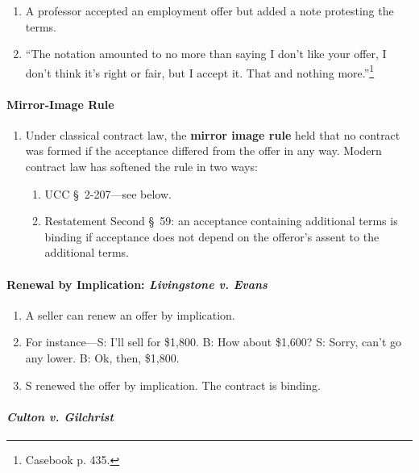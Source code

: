\begin{enumerate}
    \item A professor accepted an employment offer but added a note protesting 
    the terms.
    \item ``The notation amounted to no more than saying I don't like your 
    offer, I don't think it's right or fair, but I accept it. That and nothing 
    more.''\footnote{Casebook p. 435.}
\end{enumerate}

\paragraph{Mirror-Image Rule}

\begin{enumerate}
    \item Under classical contract law, the \textbf{mirror image rule} held 
    that no contract was formed if the acceptance differed from the offer in 
    any way. Modern contract law has softened the rule in two ways:
    \begin{enumerate}
        \item UCC \S\ 2-207---see below.
        \item Restatement Second \S\ 59: an acceptance containing additional 
        terms is binding if acceptance does not depend on the offeror's assent 
        to the additional terms.
    \end{enumerate}
\end{enumerate}

\paragraph{Renewal by Implication: \emph{Livingstone v. Evans}}

\begin{enumerate}
    \item A seller can renew an offer by implication.
    \item For instance---S: I'll sell for \$1,800. B: How about \$1,600? S: 
    Sorry, can't go any lower. B: Ok, then, \$1,800.
    \item S renewed the offer by implication. The contract is binding.
\end{enumerate}

\paragraph{\emph{Culton v. Gilchrist}}

